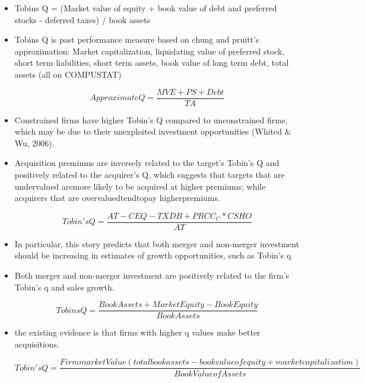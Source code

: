 \documentclass[12pt]{article}
\begin{document}
\begin{itemize}
        \item Tobins Q = (Market value of equity + book value of debt and preferred stocks - deferred taxes) / book assets \citep{MacKay2005}

        \item Tobins Q is past performance measure based on chung and pruitt's approximation: Market capitalization, liquidating value of preferred stock, short term liabilities, short term assets, book value of long term debt, total assets (all on COMPUSTAT) \citep{Brigida2012}

        \begin{displaymath}
            Approximate Q = \frac{MVE+PS+Debt}{TA}
        \end{displaymath}

        \item Constrained firms have higher Tobin's Q compared to unconstrained firms, which may be due to their unexploited investment opportunities (Whited \& Wu, 2006). \citep{Khatami2014}

        \item Acquisition premiums are inversely related to the target's Tobin's Q and positively related to the acquirer's Q, which suggests that targets that are undervalued aremore likely to be acquired at higher premiums; while acquirers that are overvaluedtendtopay higherpremiums. \citep{Khatami2014}

        \begin{displaymath}
            Tobin's Q = \frac{AT-CEQ-TXDB+PRCC_C*CSHO}{AT}
        \end{displaymath}

        \item In particular, this story predicts that both merger and non-merger investment should be increasing in estimates of growth opportunities, such as Tobin’s q \citep{Andrade2004}

        \item Both merger and non-merger investment are positively related to the firm’s Tobin’s q and sales growth. \citep{Andrade2004}

        \begin{displaymath}
            Tobins Q = \frac{Book Assets + Market Equity - Book Equity}{Book Assets}
        \end{displaymath}

        \item the existing evidence is that firms with higher q values make better acquisitions. \citep{Moeller2004}

        \begin{displaymath}
            Tobin's Q = \frac{Firm market Value (total book assets - book value of equity + market capitalization)}{Book Value of Assets}
        \end{displaymath}
    \end{itemize}
\end{document}
